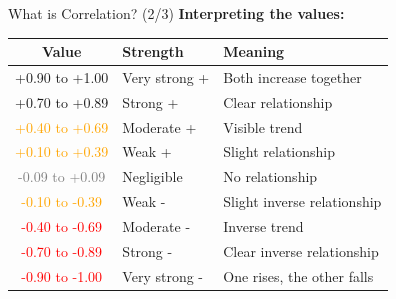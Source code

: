 \documentclass[aspectratio=169]{beamer}
\begin{document}
\begin{frame}{What is Correlation? (2/3)}
\textbf{Interpreting the values:}

\vspace{0.2cm}

\begin{center}
\small
\begin{tabular}{|c|l|l|}
\hline
\textbf{Value} & \textbf{Strength} & \textbf{Meaning} \\
\hline
\textcolor{green!60!black}{+0.90 to +1.00} & Very strong + & Both increase together \\
\textcolor{green!60!black}{+0.70 to +0.89} & Strong + & Clear relationship \\
\textcolor{orange}{+0.40 to +0.69} & Moderate + & Visible trend \\
\textcolor{orange}{+0.10 to +0.39} & Weak + & Slight relationship \\
\textcolor{gray}{-0.09 to +0.09} & Negligible & No relationship \\
\textcolor{orange}{-0.10 to -0.39} & Weak - & Slight inverse relationship \\
\textcolor{red}{-0.40 to -0.69} & Moderate - & Inverse trend \\
\textcolor{red}{-0.70 to -0.89} & Strong - & Clear inverse relationship \\
\textcolor{red}{-0.90 to -1.00} & Very strong - & One rises, the other falls \\
\hline
\end{tabular}
\end{center}
\end{frame}
\end{document}
